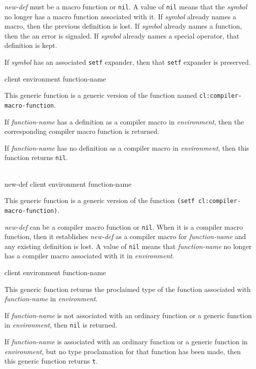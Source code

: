\textit{new-def} must be a macro function or \texttt{nil}.  A value of
\texttt{nil} means that the \textit{symbol} no longer has a macro
function associated with it.  If \textit{symbol} already names a
macro, then the previous definition is lost.  If \textit{symbol}
already names a function, then the an error is signaled.  If
\textit{symbol} already names a special operator, that definition is
kept.

If \textit{symbol} has an associated \texttt{setf} expander, then that
\texttt{setf} expander is preserved.

 {client environment function-name}

This generic function is a generic version of the \commonlisp{}
function named \texttt{cl:compiler-macro-function}.

If \textit{function-name} has a definition as a compiler macro in
\textit{environment}, then the corresponding compiler macro function
is returned.

If \textit{function-name} has no definition as a compiler macro in
\textit{environment}, then this function returns \texttt{nil}.

\\
{new-def client environment function-name}

This generic function is a generic version of the \commonlisp{}
function \texttt{(setf cl:compiler-macro-function)}.

\textit{new-def} can be a compiler macro function or \texttt{nil}.
When it is a compiler macro function, then it establishes
\textit{new-def} as a compiler macro for \textit{function-name} and
any existing definition is lost.  A value of \texttt{nil} means that
\textit{function-name} no longer has a compiler macro associated with
it in \textit{environment}.

 {client environment function-name}

This generic function returns the proclaimed type of the function
associated with \textit{function-name} in \textit{environment}.

If \textit{function-name} is not associated with an ordinary function
or a generic function in \textit{environment}, then \texttt{nil} is
returned.

If \textit{function-name} is associated with an ordinary function or a
generic function in \textit{environment}, but no type proclamation for
that function has been made, then this generic function returns
\texttt{t}.

